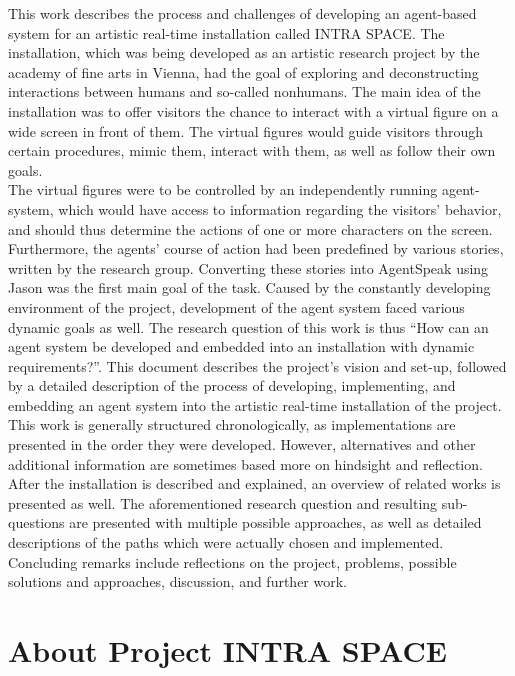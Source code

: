 \documentclass[draft,final]{vutinfth} %
\begin{document}
This work describes the process and challenges of developing an agent-based system for an artistic real-time installation called INTRA SPACE. 
The installation, which was being developed as an artistic research project by the academy of fine arts in Vienna, had the goal of exploring and deconstructing interactions between humans and so-called nonhumans. 
The main idea of the installation was to offer visitors the chance to interact with a virtual figure on a wide screen in front of them. 
The virtual figures would guide visitors through certain procedures, mimic them, interact with them, as well as follow their own goals. \\
The virtual figures were to be controlled by an independently running agent-system, which would have access to information regarding the visitors’ behavior, and should thus determine the actions of one or more characters on the screen. 
Furthermore, the agents’ course of action had been predefined by various stories, written by the research group. 
Converting these stories into AgentSpeak using Jason was the first main goal of the task. Caused by the constantly developing environment of the project, development of the agent system faced various dynamic goals as well.
The research question of this work is thus “How can an agent system be developed and embedded into an installation with dynamic requirements?”. 
This document describes the project’s vision and set-up, followed by a detailed description of the process of developing, implementing, and embedding an agent system into the artistic real-time installation of the project. \\
This work is generally structured chronologically, as implementations are presented in the order they were developed. 
However, alternatives and other additional information are sometimes based more on hindsight and reflection. 
After the installation is described and explained, an overview of related works is presented as well. The aforementioned research question and resulting sub-questions are presented with multiple possible approaches, as well as detailed descriptions of the paths which were actually chosen and implemented. 
Concluding remarks include reflections on the project, problems, possible solutions and approaches, discussion, and further work.

\section{About Project INTRA SPACE}
\label{chap:about}
\end{document}
